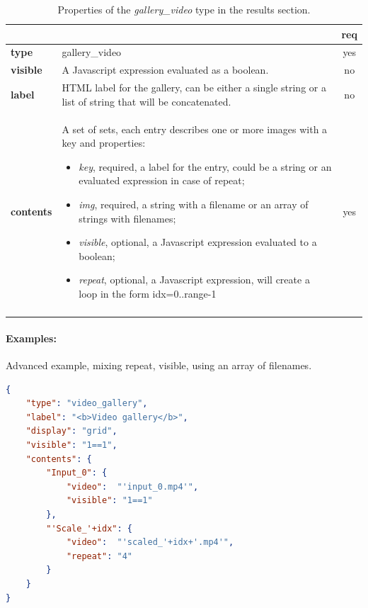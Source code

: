 \begin{longtable}{|>{\bf}L{\linewidth}|L{\linewidth}|c|}
\hline
      &  & {\bf req} 
\tabularnewline \hline \hline
 type       & gallery\_video  & yes \\ \hline
 visible    & A Javascript expression evaluated as a boolean. & no \\ \hline
 label      & HTML label for the gallery, can be either a single string or 
             a list of string that will be concatenated. & no \\ \hline
 contents   & A set of sets, each entry describes one or more images with a key and properties:
\vspace{-1em}
\begin{itemize}
    \setlength\itemsep{-0.5em}
    \item \textit{key}, required, a label for the entry, could be a string or an evaluated expression in case of repeat;
    \item \textit{img}, required, a string with a filename or an array of strings with filenames;
    \item \textit{visible}, optional, a Javascript expression evaluated to a boolean;
    \item \textit{repeat}, optional, a Javascript expression, will create a loop in the form idx=0..range-1
\end{itemize} 
\vspace{-1em} & yes \\ \hline
\caption{Properties of the \emph{gallery\_video} type in the results section.}
\end{longtable}

\paragraph{Examples:}
Advanced example, mixing repeat, visible, using an array of filenames.
\begin{lstlisting}[language=json,firstnumber=1]
{
    "type": "video_gallery",
    "label": "<b>Video gallery</b>",
    "display": "grid",
    "visible": "1==1",
    "contents": {
        "Input_0": {
            "video":  "'input_0.mp4'",
            "visible": "1==1"
        },
        "'Scale_'+idx": {
            "video":  "'scaled_'+idx+'.mp4'",
            "repeat": "4"
        }
    }
}
\end{lstlisting}



